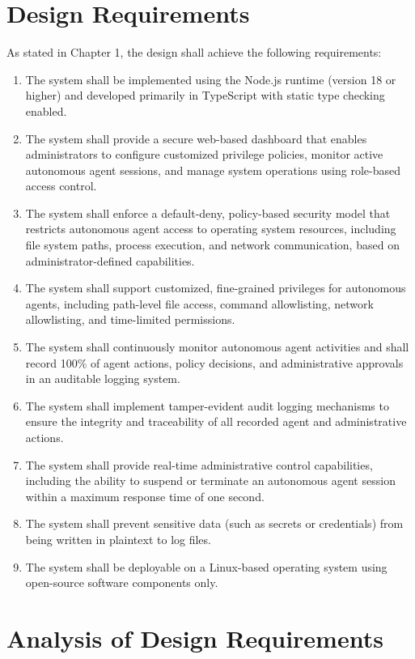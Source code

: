 \section{Design Requirements}
\label{sec:gov-requirements}
As stated in Chapter 1, the design shall achieve the following requirements:

\begin{enumerate}
    \item The system shall be implemented using the Node.js runtime (version 18 or higher) and developed primarily in TypeScript with static type checking enabled.
    \item The system shall provide a secure web-based dashboard that enables administrators to configure customized privilege policies, monitor active autonomous agent sessions, and manage system operations using role-based access control.
    \item The system shall enforce a default-deny, policy-based security model that restricts autonomous agent access to operating system resources, including file system paths, process execution, and network communication, based on administrator-defined capabilities.
    \item The system shall support customized, fine-grained privileges for autonomous agents, including path-level file access, command allowlisting, network allowlisting, and time-limited permissions.
    \item The system shall continuously monitor autonomous agent activities and shall record 100\% of agent actions, policy decisions, and administrative approvals in an auditable logging system.
    \item The system shall implement tamper-evident audit logging mechanisms to ensure the integrity and traceability of all recorded agent and administrative actions.
    \item The system shall provide real-time administrative control capabilities, including the ability to suspend or terminate an autonomous agent session within a maximum response time of one second.
    \item The system shall prevent sensitive data (such as secrets or credentials) from being written in plaintext to log files.
    \item The system shall be deployable on a Linux-based operating system using open-source software components only.
\end{enumerate}

\section{Analysis of Design Requirements}
\label{sec:gov-reqanalysis}

